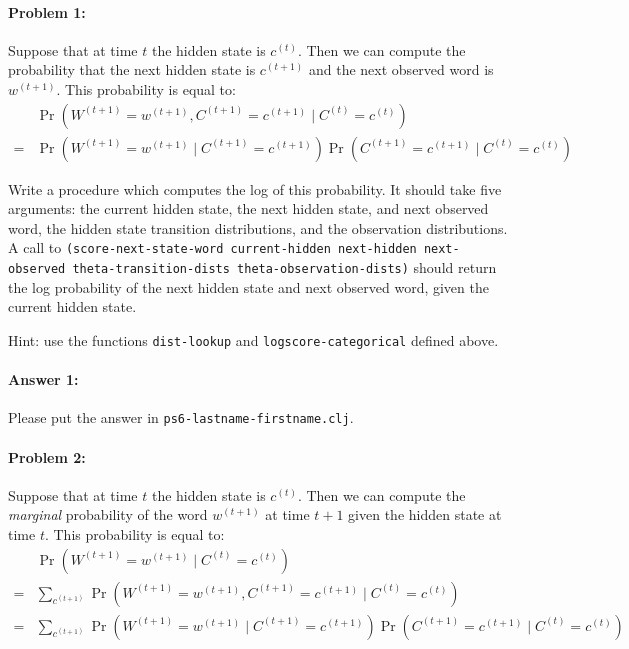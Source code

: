\documentclass[10pt]{article}
\newcommand{\required}[1]{{\color{blue}{#1}}}
\newcommand{\PSnum}{6}
\begin{document}
\hrulefill%

\paragraph{Problem 1:}

Suppose that at time $t$ the hidden state is $c^{(t)}$. Then we can
compute the probability that the next hidden state is $c^{(t+1)}$ and
the next observed word is $w^{(t+1)}$. This probability is equal to:
\begin{align*}
&\Pr(W^{(t+1)} = w^{(t+1)}, C^{(t+1)} =c^{(t+1)} \mid C^{(t)} = c^{(t)}) \\ 
=  &\Pr(W^{(t+1)} = w^{(t+1)} \mid C^{(t+1)}=c^{(t+1)}) \Pr(C^{(t+1)} =c^{(t+1)} \mid C^{(t)} = c^{(t)})
\end{align*}

Write a procedure \required{\texttt{score-next-state-word}} which computes the 
log of this probability.
It should take five arguments: the current hidden state, the next
hidden state, and next observed word, the hidden state transition distributions,
and the observation distributions. A call to \texttt{(score-next-state-word
  current-hidden next-hidden next-observed theta-transition-dists
  theta-observation-dists)} should return the log probability of the next hidden
state and next observed word, given the current hidden state.

 Hint: use the functions \texttt{dist-lookup} and
\texttt{logscore-categorical} defined above.

\paragraph{Answer 1:} Please put the answer in
\texttt{ps\PSnum-lastname-firstname.clj}.

\hrulefill%

\paragraph{Problem 2:}

Suppose that at time $t$ the hidden state is $c^{(t)}$. Then we can
compute the \emph{marginal} probability of the word $w^{(t+1)}$ at
time $t+1$ given the hidden state at time $t$. This probability is
equal to:
\begin{align*}
&\Pr(W^{(t+1)} = w^{(t+1)} \mid C^{(t)} = c^{(t)}) \\ 
=&\sum_{c^{(t+1)}} \Pr(W^{(t+1)} 
= w^{(t+1)}, C^{(t+1)} =c^{(t+1)} \mid C^{(t)} = c^{(t)})\\
=&\sum_{c^{(t+1)}} \Pr(W^{(t+1)} 
= w^{(t+1)} \mid C^{(t+1)}=c^{(t+1)}) \Pr(C^{(t+1)} =c^{(t+1)} \mid C^{(t)} = c^{(t)})
\end{align*}
\end{document}
